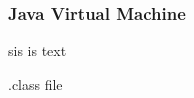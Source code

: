 \subsubsection{Java Virtual Machine} \label{subsubsection:android-evolution-jvm}
sis is text

.class file
